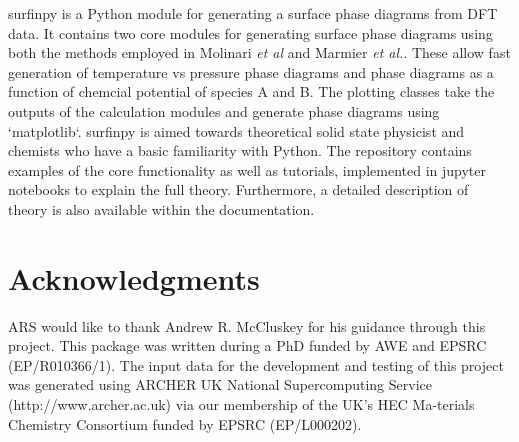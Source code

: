 \documentclass[journal=jacsat,manuscript=article]{achemso}
\begin{document}
surfinpy is a Python module for generating a surface phase diagrams from DFT data. 
It contains two core modules for generating surface phase diagrams using both the methods employed in Molinari \textit{et al} and Marmier \textit{et al.}. 
These allow fast generation of temperature vs pressure phase diagrams and phase diagrams as a function of chemcial potential of species A and B. 
The plotting classes take the outputs of the calculation modules and generate phase diagrams using `matplotlib`. 
surfinpy is aimed towards theoretical solid state physicist and chemists who have a basic familiarity with Python. 
The repository contains examples of the core functionality as well as tutorials, implemented in jupyter notebooks to explain the full theory.
Furthermore, a detailed description of theory is also available within the documentation. 

\section{Acknowledgments}

ARS would like to thank Andrew R. McCluskey for his guidance through this project. This package was written during a PhD funded by AWE and EPSRC (EP/R010366/1). The input
data for the development and testing of this project was generated using ARCHER UK National Supercomputing Service (http://www.archer.ac.uk) via our membership of 
the UK's HEC Ma-terials Chemistry Consortium funded by EPSRC (EP/L000202).


\end{document}
